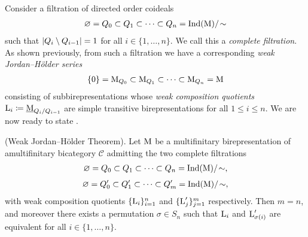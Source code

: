 \noindent Consider a filtration of directed order coideals
\begin{align*}
\begin{split}
\varnothing = Q_0 \subset Q_1 \subset \cdots \subset Q_n = \textup{Ind}(\textup{M})/\!\sim
\end{split}
\end{align*}
\noindent such that $\lvert Q_i \setminus Q_{i-1}\rvert = 1$ for all $i \in \{1, \dots, n\}$. We call this a {\em complete filtration}. As shown previously, from such a filtration we have a corresponding {\em weak Jordan--H\"{o}lder series}
\begin{align*}
\begin{split}
\{0\} = \textup{M}_{Q_0} \subset \textup{M}_{Q_1} \subset \cdots \subset \textup{M}_{Q_n} = \textup{M}
\end{split}
\end{align*}
\noindent consisting of subbirepresentations whose {\em weak composition quotients} $\textup{L}_i \coloneqq \underline{\textup{M}}_{Q_i/Q_{i-1}}$ are simple transitive birepresentations for all $1 \leq i \leq n$. We are now ready to state \cite[Theorem 8]{MM16}.\\

\noindent\begin{theorem}\label{JordanHolder}\textup{(Weak Jordan--H\"{o}lder Theorem).} Let $\textup{M}$ be a multifinitary birepresentation of a\linebreak multifinitary bicategory $\mathscr{C}$ admitting the two complete filtrations
\begin{align*}
\begin{split}
\varnothing = Q_0 \subset Q_1 \subset \cdots \subset Q_n = \textup{Ind}(\textup{M})/\!\sim,%
\end{split}
\end{align*}
\begin{align*}
\begin{split}
\varnothing = Q_0' \subset Q_1' \subset \cdots \subset Q_m' = \textup{Ind}(\textup{M})/\!\sim,
\end{split}
\end{align*}
\noindent with weak composition quotients $\{\textup{L}_i\}_{i=1}^n$ and $\{\textup{L}_j'\}_{j=1}^m$ respectively. Then $m = n$, and moreover there exists a permutation $\sigma \in S_n$ such that $\textup{L}_i$ and $\textup{L}_{\sigma(i)}'$ are equivalent for all $i \in \{1, \dots, n\}$.\\
\end{theorem}

